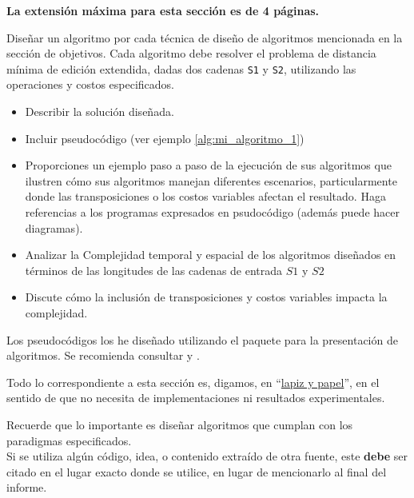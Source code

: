 \begin{mdframed}
    \textbf{La extensión máxima para esta sección es de 4 páginas.}
\end{mdframed}

Diseñar un algoritmo por cada técnica de diseño de algoritmos mencionada en la sección de objetivos. Cada algoritmo debe resolver el problema de distancia mínima de edición extendida, dadas dos cadenas \texttt{S1} y \texttt{S2}, utilizando las operaciones y costos especificados.

\begin{itemize}
    \item Describir la solución diseñada. 
    \item Incluir pseudocódigo (ver ejemplo \cref{alg:mi_algoritmo_1})
    \item Proporciones un ejemplo paso a paso de la ejecución de sus algoritmos que ilustren cómo sus algoritmos manejan diferentes escenarios, particularmente donde las
    transposiciones o los costos variables afectan el
    resultado. Haga referencias a los programas expresados en psudocódigo (además puede hacer diagramas).
    \item Analizar la Complejidad temporal y espacial de los algoritmos diseñados en términos de las longitudes de las cadenas de entrada $S1$ y $S2$
    \item Discute cómo la inclusión de transposiciones y costos   variables impacta la complejidad.
\end{itemize}

Los pseudocódigos los he diseñado utilizando el paquete  \cite{algorithm2e} para la presentación de algoritmos. Se recomienda consultar  \cite{ctan-algorithm2e} y  \cite{overleaf-algorithms}.

Todo lo correspondiente a esta sección es, digamos, en ``\href{https://dle.rae.es/metáfora}{lapiz y papel}'', en el sentido de que no necesita de implementaciones ni resultados experimentales. 

\begin{mdframed}
    Recuerde que lo importante es diseñar algoritmos que cumplan con los paradigmas especificados. \\

    Si se utiliza algún código, idea, o contenido extraído de otra fuente, este \textbf{debe} ser citado en el lugar exacto donde se utilice, en lugar de mencionarlo al final del informe. 
\end{mdframed}

